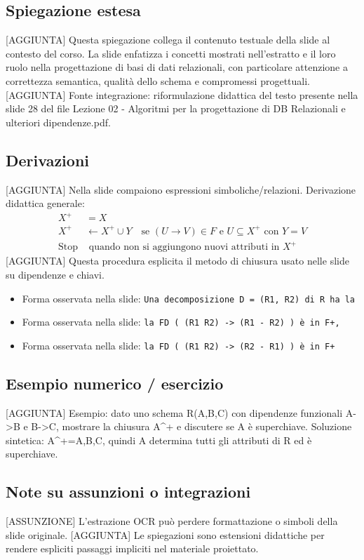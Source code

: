 \documentclass[11pt]{article}
\begin{document}
\subsection*{Spiegazione estesa}
[AGGIUNTA] Questa spiegazione collega il contenuto testuale della slide al contesto del corso. La slide enfatizza i concetti mostrati nell'estratto e il loro ruolo nella progettazione di basi di dati relazionali, con particolare attenzione a correttezza semantica, qualità dello schema e compromessi progettuali.
[AGGIUNTA] Fonte integrazione: riformulazione didattica del testo presente nella slide 28 del file Lezione 02 - Algoritmi per la progettazione di DB Relazionali e ulteriori dipendenze.pdf.
\subsection*{Derivazioni}
[AGGIUNTA] Nella slide compaiono espressioni simboliche/relazioni. Derivazione didattica generale:
\begin{align*}
X^+ &= X \\
X^+ &\leftarrow X^+ \cup Y \quad \text{se } (U \to V) \in F \text{ e } U \subseteq X^+ \text{ con } Y=V \\
\text{Stop} &\text{ quando non si aggiungono nuovi attributi in } X^+
\end{align*}
[AGGIUNTA] Questa procedura esplicita il metodo di chiusura usato nelle slide su dipendenze e chiavi.
\begin{itemize}[leftmargin=*]
\item Forma osservata nella slide: \texttt{Una decomposizione D = (R1, R2) di R ha la}
\item Forma osservata nella slide: \texttt{la FD ( (R1   R2) -> (R1 - R2) ) è in F+,}
\item Forma osservata nella slide: \texttt{la FD ( (R1   R2) -> (R2 - R1) ) è in F+}
\end{itemize}
\subsection*{Esempio numerico / esercizio}
[AGGIUNTA] Esempio: dato uno schema R(A,B,C) con dipendenze funzionali A->B e B->C, mostrare la chiusura A^+ e discutere se A è superchiave. Soluzione sintetica: A^+={A,B,C}, quindi A determina tutti gli attributi di R ed è superchiave.
\subsection*{Note su assunzioni o integrazioni}
[ASSUNZIONE] L'estrazione OCR può perdere formattazione o simboli della slide originale.
[AGGIUNTA] Le spiegazioni sono estensioni didattiche per rendere espliciti passaggi impliciti nel materiale proiettato.
\end{document}
